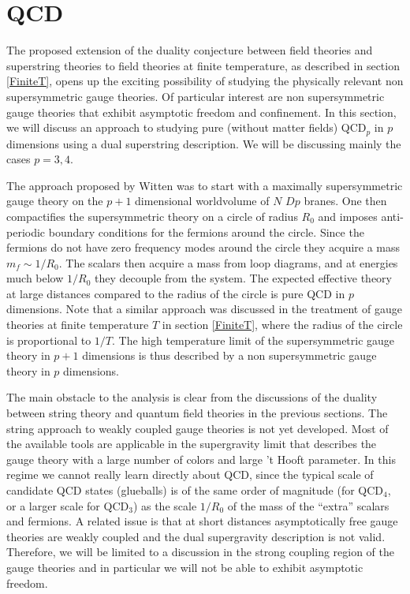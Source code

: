 \section{QCD} 
\label{adsqcd}

The proposed extension of the duality conjecture between field
theories and superstring theories to field theories at finite 
temperature, as described in section \ref{FiniteT}, opens up the
exciting possibility of studying the physically relevant non
supersymmetric gauge theories.  Of particular interest are non
supersymmetric gauge theories that exhibit asymptotic freedom and
confinement.  In this section, we will discuss an approach to studying
pure (without matter fields) QCD$_p$ in $p$ dimensions using a dual
superstring description.  We will be discussing mainly the cases
$p=3,4$.

The approach proposed by Witten \cite{Witten:1998zw} was to start with
a maximally supersymmetric gauge theory on the $p+1$ dimensional
worldvolume of $N$ $Dp$ branes. One then compactifies the
supersymmetric theory on a circle of radius $R_0$ and imposes
anti-periodic boundary conditions for the fermions around the
circle. Since the fermions do not have zero frequency modes around the
circle they acquire a mass $m_f \sim 1/R_0$.  The scalars then acquire
a mass from loop diagrams, and at energies much below $1/R_0$ they
decouple from the system. The expected effective theory at large
distances compared to the radius of the circle is pure QCD in $p$
dimensions.  Note that a similar approach was discussed in the
treatment of  gauge theories at finite
temperature $T$ in section \ref{FiniteT}, where the radius of the circle is
proportional to $1/T$.  The high temperature limit of the
supersymmetric gauge theory in $p+1$ dimensions is thus described by a
non supersymmetric gauge theory in $p$ dimensions.

The main obstacle to the analysis is clear from the discussions of the
duality between string theory and quantum field theories in the
previous sections.  The string approach to weakly coupled gauge
theories is not yet developed.  Most of the available tools are
applicable in the supergravity limit that describes the gauge theory
with a large number of colors and large 't Hooft parameter. In this
regime we cannot really learn directly about QCD, since the typical
scale of candidate 
QCD states (glueballs) is of the same order of magnitude (for
QCD$_4$, or a larger scale for QCD$_3$) as the scale $1/R_0$ of the
mass of the ``extra'' scalars and fermions. A related issue is that
at
short distances asymptotically free gauge theories are weakly coupled
and the dual supergravity description is not valid.  Therefore, we
will be limited to a discussion in the strong coupling region of the
gauge theories and in particular we will not be able to exhibit
asymptotic freedom.

